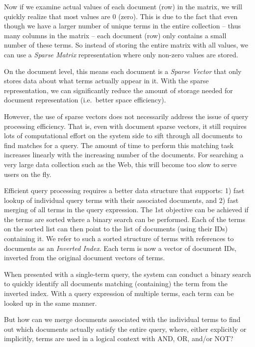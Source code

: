 \documentclass[
  letterpaper,
]{scrbook}
\begin{document}
Now if we examine actual values of each document (row) in the matrix, we
will quickly realize that most values are \(0\) (zero). This is due to
the fact that even though we have a larger number of unique terms in the
entire collection -- thus many columns in the matrix -- each document
(row) only contains a small number of these terms. So instead of storing
the entire matrix with all values, we can use a \emph{Sparse Matrix}
representation where only non-zero values are stored.

On the document level, this means each document is a \emph{Sparse
Vector} that only stores data about what terms actually appear in it.
With the sparse representation, we can significantly reduce the amount
of storage needed for document representation (i.e.~better space
efficiency).

However, the use of sparse vectors does not necessarily address the
issue of query processing efficiency. That is, even with document sparse
vectors, it still requires lots of computational effort on the system
side to sift through all documents to find matches for a query. The
amount of time to perform this matching task increases linearly with the
increasing number of the documents. For searching a very large data
collection such as the Web, this will become too slow to serve users on
the fly.

Efficient query processing requires a better data structure that
supports: 1) fast lookup of individual query terms with their associated
documents, and 2) fast merging of all terms in the query expression. The
1st objective can be achieved if the terms are sorted where a binary
search can be performed. Each of the terms on the sorted list can then
point to the list of documents (using their IDs) containing it. We refer
to such a sorted structure of terms with references to documents as an
\emph{Inverted Index}. Each term is now a vector of document IDs,
inverted from the original document vectors of terms.

When presented with a single-term query, the system can conduct a binary
search to quickly identify all documents matching (containing) the term
from the inverted index. With a query expression of multiple terms, each
term can be looked up in the same manner.

But how can we merge documents associated with the individual terms to
find out which documents actually satisfy the entire query, where,
either explicitly or implicitly, terms are used in a logical context
with AND, OR, and/or NOT?
\end{document}
